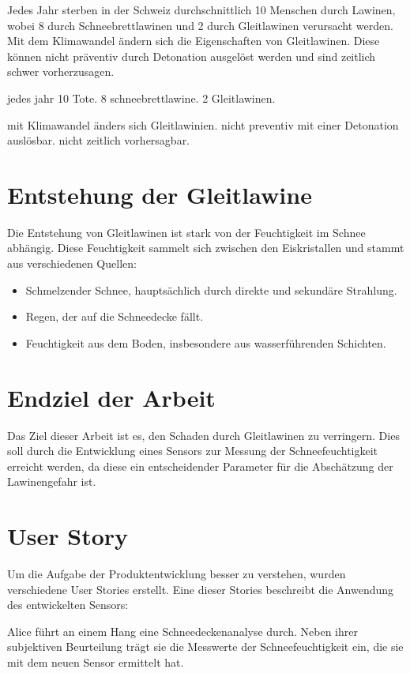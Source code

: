 

Jedes Jahr sterben in der Schweiz durchschnittlich 10 Menschen durch Lawinen, wobei 8 durch Schneebrettlawinen und 2 durch Gleitlawinen verursacht werden. Mit dem Klimawandel ändern sich die Eigenschaften von Gleitlawinen. Diese können nicht präventiv durch Detonation ausgelöst werden und sind zeitlich schwer vorherzusagen.

\iffalse
jedes jahr 10 Tote. 8 schneebrettlawine. 2 Gleitlawinen.

mit Klimawandel änders sich Gleitlawinien. nicht preventiv mit einer Detonation auslösbar. nicht zeitlich vorhersagbar.


\section{Entstehung der Gleitlawine}

Die Entstehung von Gleitlawinen ist stark von der Feuchtigkeit im Schnee abhängig. Diese Feuchtigkeit sammelt sich zwischen den Eiskristallen und stammt aus verschiedenen Quellen:
\begin{itemize}
    \item Schmelzender Schnee, hauptsächlich durch direkte und sekundäre Strahlung.
    \item Regen, der auf die Schneedecke fällt.
    \item Feuchtigkeit aus dem Boden, insbesondere aus wasserführenden Schichten.
\end{itemize}

\section{Endziel der Arbeit}

Das Ziel dieser Arbeit ist es, den Schaden durch Gleitlawinen zu verringern. Dies soll durch die Entwicklung eines Sensors zur Messung der Schneefeuchtigkeit erreicht werden, da diese ein entscheidender Parameter für die Abschätzung der Lawinengefahr ist.

\section{User Story}

Um die Aufgabe der Produktentwicklung besser zu verstehen, wurden verschiedene User Stories erstellt. Eine dieser Stories beschreibt die Anwendung des entwickelten Sensors:

Alice führt an einem Hang eine Schneedeckenanalyse durch. Neben ihrer subjektiven Beurteilung trägt sie die Messwerte der Schneefeuchtigkeit ein, die sie mit dem neuen Sensor ermittelt hat.

